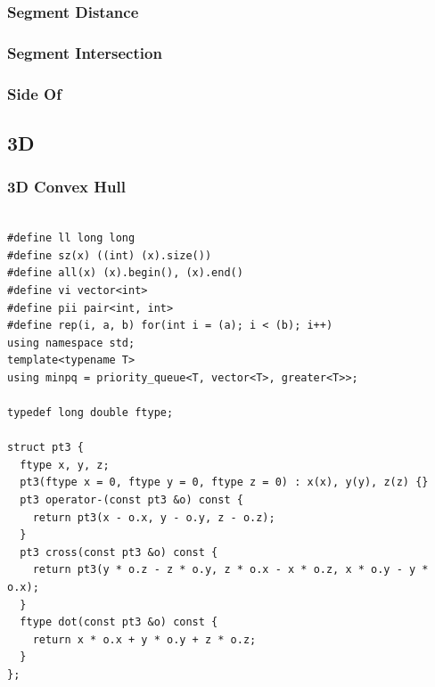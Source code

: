 \documentclass[9pt, landscape, a4paper,twosided]{extarticle}
\begin{document}
\begin{multicols*}{3}
\subsubsection{Segment Distance}

\subsubsection{Segment Intersection}

\subsubsection{Side Of}

\subsection{3D}
\subsubsection{3D Convex Hull}
\begin{verbatim}

#define ll long long
#define sz(x) ((int) (x).size())
#define all(x) (x).begin(), (x).end()
#define vi vector<int>
#define pii pair<int, int>
#define rep(i, a, b) for(int i = (a); i < (b); i++)
using namespace std;
template<typename T>
using minpq = priority_queue<T, vector<T>, greater<T>>;

typedef long double ftype;

struct pt3 {
  ftype x, y, z;
  pt3(ftype x = 0, ftype y = 0, ftype z = 0) : x(x), y(y), z(z) {}
  pt3 operator-(const pt3 &o) const {
    return pt3(x - o.x, y - o.y, z - o.z);
  }
  pt3 cross(const pt3 &o) const {
    return pt3(y * o.z - z * o.y, z * o.x - x * o.z, x * o.y - y * o.x);
  }
  ftype dot(const pt3 &o) const {
    return x * o.x + y * o.y + z * o.z;
  }
};


\end{verbatim}
\end{multicols*}
\end{document}
